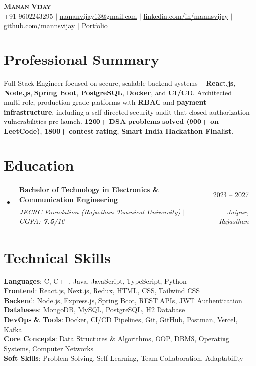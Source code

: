 \documentclass[letterpaper,11pt]{article}
\makeatletter
\newcommand{\resumeSubheading}[4]{
  \vspace{-2pt}\item
    \begin{tabular*}{0.97\textwidth}[t]{l@{\extracolsep{\fill}}r}
      \textbf{#1} & #2 \\
      \textit{\small#3} & \textit{\small #4} \\
    \end{tabular*}\vspace{-9pt}
}
\newcommand{\resumeSubHeadingListStart}{\begin{itemize}[leftmargin=0.15in, label={}]}
\newcommand{\resumeSubHeadingListEnd}{\end{itemize}}
\makeatother
\begin{document}
\begin{center}
    \textbf{\Huge \scshape Manan Vijay} \\ \vspace{3pt}
    \small
    +91 9602243295 $|$
    \href{mailto:mananvijay13@gmail.com}{\underline{mananvijay13@gmail.com}} $|$
    \href{https://www.linkedin.com/in/mannsvijay/}{\underline{linkedin.com/in/mannsvijay}} $|$
    \href{https://github.com/mannsvijay}{\underline{github.com/mannsvijay}} $|$
    \href{https://mannsvijay.vercel.app/}{\underline{Portfolio}}
\end{center}

\section{Professional Summary}
\small{
Full-Stack Engineer focused on secure, scalable backend systems -- \textbf{React.js}, \textbf{Node.js}, \textbf{Spring Boot}, \textbf{PostgreSQL}, \textbf{Docker}, and \textbf{CI/CD}. Architected multi-role, production-grade platforms with \textbf{RBAC} and \textbf{payment infrastructure}, including a self-directed security audit that closed authorization vulnerabilities pre-launch. \textbf{1200+ DSA problems solved (900+ on LeetCode)}, \textbf{1800+ contest rating}, \textbf{Smart India Hackathon Finalist}.
}
\section{Education}
  \resumeSubHeadingListStart
    \resumeSubheading
      {Bachelor of Technology in Electronics \& Communication Engineering}{2023 -- 2027}
      {JECRC Foundation (Rajasthan Technical University) $|$ CGPA: \textbf{7.5}/10}{Jaipur, Rajasthan}
  \resumeSubHeadingListEnd



  \section{Technical Skills}
 \begin{itemize}[leftmargin=0.15in, label={}]
    \small{\item{
     \textbf{Languages}{: C, C++, Java, JavaScript, TypeScript, Python} \\
     \textbf{Frontend}{: React.js, Next.js, Redux, HTML, CSS, Tailwind CSS} \\
     \textbf{Backend}{: Node.js, Express.js, Spring Boot, REST APIs, JWT Authentication} \\
     \textbf{Databases}{: MongoDB, MySQL, PostgreSQL, H2 Database} \\
     \textbf{DevOps \& Tools}{: Docker, CI/CD Pipelines, Git, GitHub, Postman, Vercel, Kafka} \\
     \textbf{Core Concepts}{: Data Structures \& Algorithms, OOP, DBMS, Operating Systems, Computer Networks} \\
     \textbf{Soft Skills}{: Problem Solving, Self-Learning, Team Collaboration, Adaptability} \\
    }}
 \end{itemize}
\end{document}
